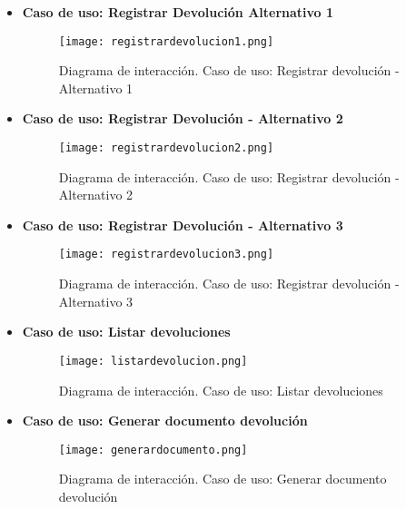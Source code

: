 \begin{itemize}
\newpage
\item \textbf{Caso de uso: Registrar Devolución Alternativo 1}
\begin{figure}[!htb]
  \centering
    \texttt{[image: registrardevolucion1.png]}
  \caption{Diagrama de interacción. Caso de uso: Registrar devolución - Alternativo 1}
  \label{a}
\end{figure}
\clearpage
\item \textbf{Caso de uso: Registrar Devolución - Alternativo 2}
\begin{figure}[!htb]
  \centering
    \texttt{[image: registrardevolucion2.png]}
  \caption{Diagrama de interacción. Caso de uso: Registrar devolución - Alternativo 2}
  \label{a}
\end{figure}

\item \textbf{Caso de uso: Registrar Devolución - Alternativo 3}
\begin{figure}[!htb]
  \centering
    \texttt{[image: registrardevolucion3.png]}
  \caption{Diagrama de interacción. Caso de uso: Registrar devolución - Alternativo 3}
  \label{a}
\end{figure}

\newpage
\item \textbf{Caso de uso: Listar devoluciones}
\begin{figure}[!htb]
  \centering
    \texttt{[image: listardevolucion.png]}
  \caption{Diagrama de interacción. Caso de uso: Listar devoluciones}
  \label{a}
\end{figure}

\item \textbf{Caso de uso: Generar documento devolución}
\begin{figure}[!htb]
  \centering
    \texttt{[image: generardocumento.png]}
  \caption{Diagrama de interacción. Caso de uso: Generar documento devolución}
  \label{a}
\end{figure}


\end{itemize}
